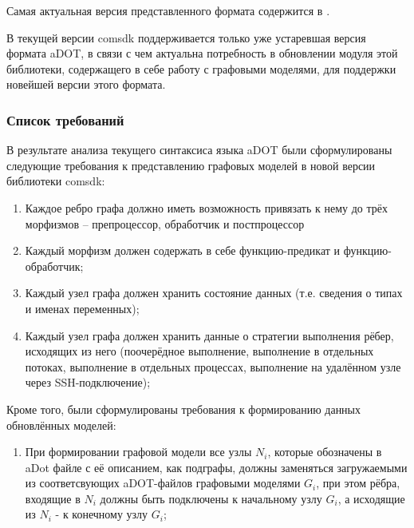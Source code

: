 Самая актуальная версия представленного формата содержится в \cite{SokolovADOT2020}.

В текущей версии comsdk поддерживается только уже устаревшая версия формата aDOT, в связи с чем актуальна потребность в обновлении модуля этой библиотеки, содержащего в себе работу с графовыми моделями, для поддержки новейшей версии этого формата.

\subsubsection{Список требований}
В результате анализа текущего синтаксиса языка aDOT были сформулированы следующие требования к представлению графовых моделей в новой версии библиотеки comsdk:
\begin{enumerate}[label=\arabic*)]
    \item Каждое ребро графа должно иметь возможность привязать к нему до трёх морфизмов -- препроцессор, обработчик и постпроцессор
    \item Каждый морфизм должен содержать в себе функцию-предикат и функцию-обработчик;
    \item Каждый узел графа должен хранить состояние данных (т.е. сведения о типах и именах переменных);
    \item Каждый узел графа должен хранить данные о стратегии выполнения рёбер, исходящих из него (поочерёдное выполнение, выполнение в отдельных потоках, выполнение в отдельных процессах, выполнение на удалённом узле через SSH-подключение);
\end{enumerate}

Кроме того, были сформулированы требования к формированию данных обновлённых моделей:
\begin{enumerate}
    \item При формировании графовой модели все узлы $N_i$, которые обозначены в aDot файле с её описанием, как подграфы, должны заменяться загружаемыми из соответсвующих aDOT-файлов графовыми моделями $G_i$, при этом рёбра, входящие в $N_i$ должны быть подключены к начальному узлу $G_i$, а исходящие из $N_i$ - к конечному узлу $G_i$;
\end{enumerate}

\noteattributes{}
